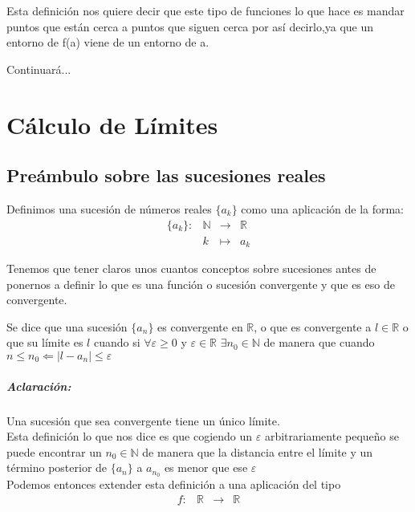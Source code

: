 Esta definición nos quiere decir que este tipo de funciones lo que hace es mandar puntos que están cerca a puntos que siguen cerca por así decirlo,ya que un entorno de f(a) viene de un entorno de a.


Continuará...


\chapter{Cálculo de Límites}
\minitoc

\newpage

\section{Preámbulo sobre las sucesiones reales}
\begin{defi}
Definimos una sucesión de números reales $\lbrace a_k \rbrace$ como una aplicación de la forma: 
$$
\begin{array}{rccl}
\lbrace a_k \rbrace  \colon & \mathbb{N} & \longrightarrow & \mathbb{R}\\
& k & \longmapsto & a_k
\end{array}
$$
\end{defi}
\noindent
Tenemos que tener claros unos cuantos conceptos sobre sucesiones antes de ponernos a definir lo que es una función o sucesión convergente y que es eso de convergente. 

\begin{defi}
Se dice que una sucesión $\lbrace a_n \rbrace$ es convergente en $\mathbb{R}$, o que es convergente a $l\in \mathbb{R}$ o que su límite es $l$ cuando si $\forall \varepsilon \geq 0$ y $\varepsilon \in \mathbb{R}$ $\exists n_0\in \mathbb{N}$ de manera que cuando $n\leq n_0\Leftarrow |l-a_n|\leq \varepsilon$
\end{defi}

\paragraph*{\textit{Aclaración:}} Una sucesión que sea convergente tiene un único límite.\\[2ex]
\noindent
Esta definición lo que nos dice es que cogiendo un $\varepsilon$ arbitrariamente pequeño se puede encontrar un $n_0 \in \mathbb{N}$ de manera que la distancia entre el límite y un término posterior de $\lbrace a_n \rbrace$ a $a_{n_0}$ es menor que ese $\varepsilon$\\

\noindent
Podemos entonces extender esta definición a una aplicación del tipo
\begin{equation*}
\begin{array}{rccl}
f \colon & \mathbb{R} & \longrightarrow & \mathbb{R}\\

\end{array}
\end{equation*}

